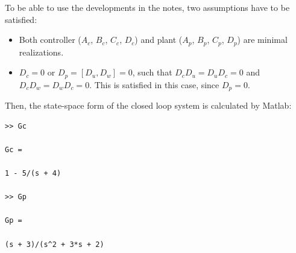 To be able to use the developments in the notes, two assumptions have to be satisfied:
\begin{itemize}
    \item Both controller ($A_c$, $B_c$, $C_c$, $D_c$) and plant ($A_p$, $B_p$, $C_p$, $D_p$) are minimal realizations.
    \item $D_c= 0$ or $D_p = [D_u, D_w] = 0$, such that $D_c D_u = D_u D_c = 0$ and $D_c D_w = D_w D_c = 0$. This is satisfied in this case, since $D_p = 0$.
\end{itemize}
Then, the state-space form of the closed loop system is calculated by Matlab:
\begin{verbatim}
>> Gc
 
Gc =
 
1 - 5/(s + 4)
 
>> Gp
 
Gp =
 
(s + 3)/(s^2 + 3*s + 2)
\end{verbatim}

